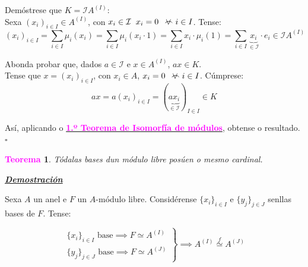 \documentclass[twoside]{report}
\newcommand{\magbf}[1]{\textcolor{magenta}{\textbf{#1}}} %
\newcommand{\almostall}{\mathrel{\vee\mkern-19mu\frown}} %
\theoremstyle{mystyle}
\newtheorem{theo}{\magbf{Teorema}}[chapter]
\newenvironment{theorem}
{\begin{mdframed}[linecolor = magenta,backgroundcolor = classicrose, linewidth = 2mm]\begin{theo}}
{\end{theo}\end{mdframed}}
\begin{document}
\noindent Demóstrese que $K = \mathcal{I}A^{(I)}$:\\

\noindent {} Sexa $(x_{i})_{i \in I} \in A^{(I)}$, con $x_{i} \in \mathcal{I} \hspace{2mm} x_{i} = 0 \hspace{2mm} \almostall i \in I $. Tense:
$$(x_{i})_{i \in I} = \displaystyle \sum_{i \in I} \mu_{i}(x_{i}) = \displaystyle \sum_{i \in I} \mu_{i}(x_{i} \cdot 1) = \displaystyle \sum_{i \in I} x_{i} \cdot \mu_{i}(1) = \displaystyle \sum_{i \in I} \underbrace{x_{i}}_{\in \mathcal{I}} \cdot e_{i} \in \mathcal{I}A^{(I)}$$

\noindent {} Abonda probar que, dados $a \in \mathcal{I}$ e $x \in A^{(I)}$, $ax \in K$.\\

\noindent Tense que $x = (x_{i})_{i \in I}$, con $x_{i} \in A$, $x_{i} = 0 \hspace{2mm} \almostall i \in I$. Cúmprese:
$$ax = a(x_{i})_{i \in I} = (\underbrace{ax_{i}}_{\in \mathcal{I}})_{I \in I} \in K$$

\noindent Así, aplicando o \hyperref[th3.1]{\magbf{1.º Teorema de Isomorfía de módulos}}, obtense o resultado. $\square$\\

\vspace{3mm}

\begin{theorem} \label{th3.6}
Tódalas bases dun módulo libre posúen o mesmo cardinal.
\end{theorem}

\vspace{2mm}

\noindent \textbf{\textit{\underline{Demostración}}}

\vspace{2mm}

\noindent Sexa $A$ un anel e $F$ un $A$-módulo libre. Considérense $\{x_{i}\}_{i \in I}$ e $\{y_{j}\}_{j \in J}$ senllas bases de $F$. Tense:

    \[ 
    \left. \begin{array}{r} 
    \{x_{i}\}_{i \in I} \text{ base} \implies F \simeq A^{(I)} \\[1ex]
    \{y_{j}\}_{j \in J} \text{ base} \implies F \simeq A^{(J)} 
    \end{array} \right\} 
    \implies A^{(I)} \overset{f}{\simeq} A^{(J)}
    \]
    
\end{document}
